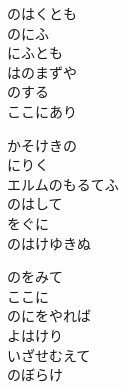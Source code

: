 \documentclass[10pt,b5j]{tarticle} %
\begin{document}
\begin{enumerate}
\begin{minipage}[c]{\blocksize}
        \vspace{\linespace}
        \item
        のはくとも\\
        のにふ\\
        にふとも\\
        はのまずや\\
        のする\\
        ここにあり
        
        \vspace{\linespace}
        \item
        かそけきの\\
        にりく\\
        エルムのもるてふ\\
        のはして\\
        をぐに\\
        のはけゆきぬ
        
        \vspace{\linespace}
        \item
        のをみて\\
        ここに\\
        のにをやれば\\
        よはけり\\
        いざせむえて\\
        のぼらけ
    
    \end{minipage}
\end{enumerate} %
\end{document}
